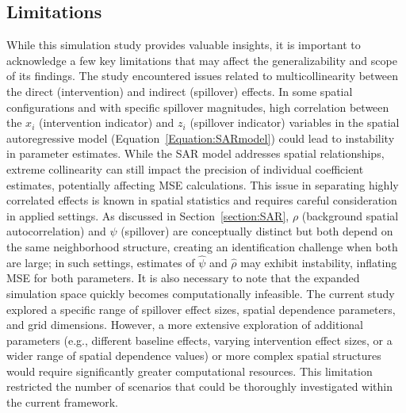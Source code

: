 \documentclass{article}[11pt]
\begin{document}
\subsection{Limitations}

While this simulation study provides valuable insights, it is important to acknowledge a few key limitations that may affect the generalizability and scope of its findings. The study encountered issues related to multicollinearity between the direct (intervention) and indirect (spillover) effects. In some spatial configurations and with specific spillover magnitudes, high correlation between the $x_i$ (intervention indicator) and $z_i$ (spillover indicator) variables in the spatial autoregressive model (Equation~\ref{Equation:SARmodel}) could lead to instability in parameter estimates. While the SAR model addresses spatial relationships, extreme collinearity can still impact the precision of individual coefficient estimates, potentially affecting MSE calculations. This issue in separating highly correlated effects is known in spatial statistics and requires careful consideration in applied settings. As discussed in Section~\ref{section:SAR}, $\rho$ (background spatial autocorrelation) and $\psi$ (spillover) are conceptually distinct but both depend on the same neighborhood structure, creating an identification challenge when both are large; in such settings, estimates of $\hat{\psi}$ and $\hat{\rho}$ may exhibit instability, inflating MSE for both parameters. It is also necessary to note that the expanded simulation space quickly becomes computationally infeasible. The current study explored a specific range of spillover effect sizes, spatial dependence parameters, and grid dimensions. However, a more extensive exploration of additional parameters (e.g., different baseline effects, varying intervention effect sizes, or a wider range of spatial dependence values) or more complex spatial structures would require significantly greater computational resources. This limitation restricted the number of scenarios that could be thoroughly investigated within the current framework.
\end{document}
